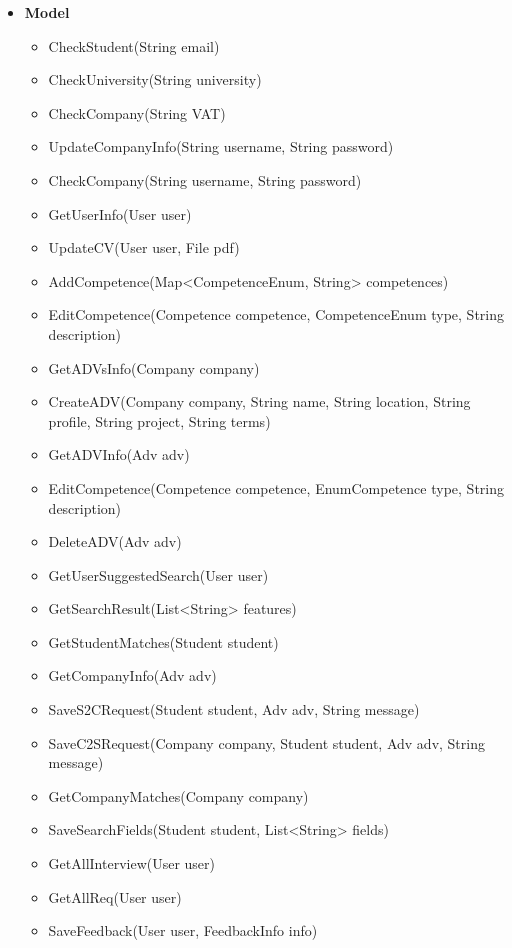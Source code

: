\begin{itemize}
    \item \textbf{Model}
         \begin{itemize}
            \item CheckStudent(String email)
            \item CheckUniversity(String university)
            \item CheckCompany(String VAT)
            \item UpdateCompanyInfo(String username, String password)
            \item CheckCompany(String username, String password)
            \item GetUserInfo(User user)
            \item UpdateCV(User user, File pdf)
            \item AddCompetence(Map<CompetenceEnum, String> competences)
            \item EditCompetence(Competence competence, CompetenceEnum type, String description)
            \item GetADVsInfo(Company company)
            \item CreateADV(Company company, String name, String location, String profile, String project, String terms)
            \item GetADVInfo(Adv adv)
            \item EditCompetence(Competence competence, EnumCompetence type, String description)
            \item DeleteADV(Adv adv)
            \item GetUserSuggestedSearch(User user)
            \item GetSearchResult(List<String> features)
            \item GetStudentMatches(Student student)
            \item GetCompanyInfo(Adv adv)
            \item SaveS2CRequest(Student student, Adv adv, String message)
            \item SaveC2SRequest(Company company, Student student, Adv adv, String message)
            \item GetCompanyMatches(Company company)
            \item SaveSearchFields(Student student, List<String> fields)
            \item GetAllInterview(User user)
            \item GetAllReq(User user)
            \item SaveFeedback(User user, FeedbackInfo info)

\end{itemize}
\end{itemize}
